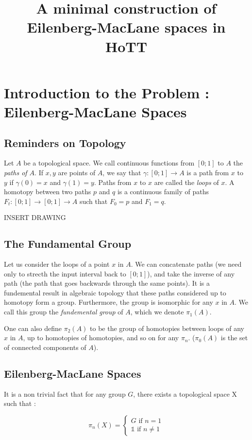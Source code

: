 \documentclass{article}
\title{A minimal construction of Eilenberg-MacLane spaces in HoTT}
\begin{document}
\tableofcontents

\section{Introduction to the Problem : Eilenberg-MacLane Spaces}

\subsection{Reminders on Topology}

Let $A$ be a topological space. We call continuous functions from $[0;1]$ to $A$ the \emph{paths of $A$}. If $x,y$ are points of $A$, we say that $\gamma : [0;1] \to A$ is a path from $x$ to $y$ if $\gamma(0) = x$ and $\gamma(1) = y$. Paths from $x$ to $x$ are called the \emph{loops} of $x$. A homotopy between two paths $p$ and $q$ is a continuous family of paths $F_{t} : [0;1] \to [0;1] \to A$ such that $F_{0} = p$ and $F_{1} = q$.

INSERT DRAWING

\subsection{The Fundamental Group}

Let us consider the loops of a point $x$ in $A$. We can concatenate paths (we need only to strecth the input interval back to $[0;1]$), and take the inverse of any path (the path that goes backwards through the same points). It is a fundemental result in algebraic topology that these paths considered up to homotopy form a group. Furthermore, the group is isomorphic for any $x$ in $A$. We call this group the \emph{fundemental group} of $A$, which we denote $\pi_{1}(A)$.

One can also define $\pi_{2}(A)$ to be the group of homotopies between loops of any $x$ in $A$, up to homotopies of homotopies, and so on for any $\pi_{n}$. ($\pi_{0}(A)$ is the set of connected components of $A$).

\subsection{Eilenberg-MacLane Spaces}

It is a non trivial fact that for any group $G$, there exists a topological space X such that :

\[
\pi_{n}(X) =
\begin{cases}
  G \text{ if } n = 1 \\
  \mathbb{1} \text{ if } n \neq 1
\end{cases}
\]
\end{document}
